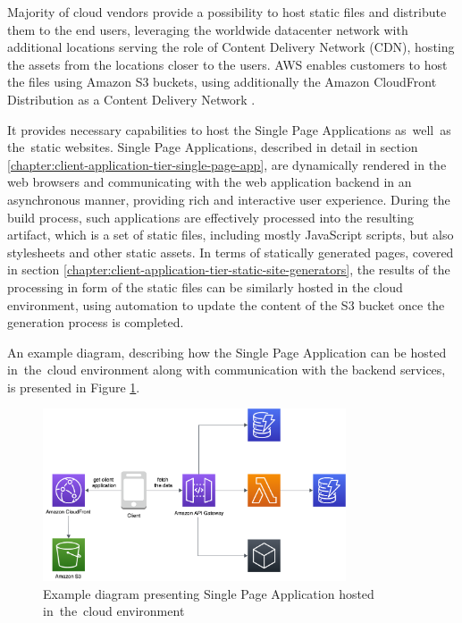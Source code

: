 Majority of cloud vendors provide a possibility to host static files and distribute them to the end users, leveraging the worldwide datacenter network with additional locations serving the role of Content Delivery Network (CDN), hosting the assets from the locations closer to the users.
AWS enables customers to host the files using Amazon S3 buckets, using additionally the Amazon CloudFront Distribution as a Content Delivery Network  \cite{AWSWebHosting}.

It provides necessary capabilities to host the Single Page Applications as~well~as the~static websites.
Single Page Applications, described in detail in section \ref{chapter:client-application-tier-single-page-app}, are dynamically rendered in the web browsers and communicating with the web application backend in an asynchronous manner, providing rich and interactive user experience.
During the build process, such applications are effectively processed into the resulting artifact, which is a set of static files, including mostly JavaScript scripts, but also stylesheets and other static assets.
In terms of statically generated pages, covered in section \ref{chapter:client-application-tier-static-site-generators}, the results of the processing in form of the static files can be similarly hosted in the cloud environment, using automation to update the content of the S3 bucket once the generation process is completed.

An example diagram, describing how the Single Page Application can be hosted in~the~cloud environment along with communication with the backend services, is presented in Figure \ref{fig:pattern-client-hosted}.

\begin{figure}[H]
   \centering
   \includegraphics[width=0.8\textwidth]{assets/04-serverless-for-web-apps/hostedClient.png}
   \caption{Example diagram presenting Single Page Application hosted in~the~cloud environment}
   \label{fig:pattern-client-hosted}
\end{figure}

